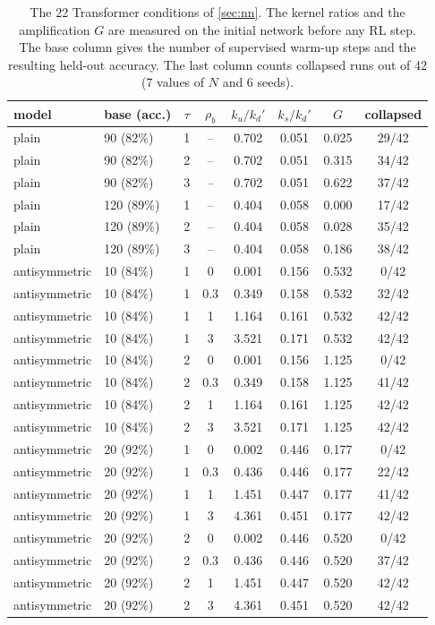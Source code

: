 \begin{table}[h]
\centering\small
\caption{The 22 Transformer conditions of \cref{sec:nn}. The kernel ratios and the amplification $G$ are measured on the initial network before any RL step. The base column gives the number of supervised warm-up steps and the resulting held-out accuracy. The last column counts collapsed runs out of 42 (7 values of $N$ and 6 seeds).}
\label{tab:conditions}
\begin{tabular}{llcccccc}
\toprule
model & base (acc.) & $\tau$ & $\rho_b$ & $k_u/k_d'$ & $k_s/k_d'$ & $G$ & collapsed \\
\midrule
plain & 90 (82\%) & 1 & -- & 0.702 & 0.051 & 0.025 & 29/42 \\
plain & 90 (82\%) & 2 & -- & 0.702 & 0.051 & 0.315 & 34/42 \\
plain & 90 (82\%) & 3 & -- & 0.702 & 0.051 & 0.622 & 37/42 \\
\addlinespace
plain & 120 (89\%) & 1 & -- & 0.404 & 0.058 & 0.000 & 17/42 \\
plain & 120 (89\%) & 2 & -- & 0.404 & 0.058 & 0.028 & 35/42 \\
plain & 120 (89\%) & 3 & -- & 0.404 & 0.058 & 0.186 & 38/42 \\
\addlinespace
antisymmetric & 10 (84\%) & 1 & 0 & 0.001 & 0.156 & 0.532 & 0/42 \\
antisymmetric & 10 (84\%) & 1 & 0.3 & 0.349 & 0.158 & 0.532 & 32/42 \\
antisymmetric & 10 (84\%) & 1 & 1 & 1.164 & 0.161 & 0.532 & 42/42 \\
antisymmetric & 10 (84\%) & 1 & 3 & 3.521 & 0.171 & 0.532 & 42/42 \\
antisymmetric & 10 (84\%) & 2 & 0 & 0.001 & 0.156 & 1.125 & 0/42 \\
antisymmetric & 10 (84\%) & 2 & 0.3 & 0.349 & 0.158 & 1.125 & 41/42 \\
antisymmetric & 10 (84\%) & 2 & 1 & 1.164 & 0.161 & 1.125 & 42/42 \\
antisymmetric & 10 (84\%) & 2 & 3 & 3.521 & 0.171 & 1.125 & 42/42 \\
\addlinespace
antisymmetric & 20 (92\%) & 1 & 0 & 0.002 & 0.446 & 0.177 & 0/42 \\
antisymmetric & 20 (92\%) & 1 & 0.3 & 0.436 & 0.446 & 0.177 & 22/42 \\
antisymmetric & 20 (92\%) & 1 & 1 & 1.451 & 0.447 & 0.177 & 41/42 \\
antisymmetric & 20 (92\%) & 1 & 3 & 4.361 & 0.451 & 0.177 & 42/42 \\
antisymmetric & 20 (92\%) & 2 & 0 & 0.002 & 0.446 & 0.520 & 0/42 \\
antisymmetric & 20 (92\%) & 2 & 0.3 & 0.436 & 0.446 & 0.520 & 37/42 \\
antisymmetric & 20 (92\%) & 2 & 1 & 1.451 & 0.447 & 0.520 & 42/42 \\
antisymmetric & 20 (92\%) & 2 & 3 & 4.361 & 0.451 & 0.520 & 42/42 \\
\bottomrule
\end{tabular}
\end{table}
